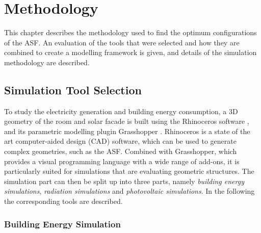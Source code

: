\chapter{Methodology}
\label{c:methodology}
	


	This chapter describes the methodology used to find the optimum configurations of the ASF. An evaluation of the tools that were selected and how they are combined to create a modelling framework is given, and details of the simulation methodology are described.

	\section{Simulation Tool Selection}


		To study the electricity generation and building energy consumption, a 3D geometry of the room and solar facade is built using the Rhinoceros software \cite{Rhino}, and its parametric modelling plugin Grasshopper \cite{grasshopper}. Rhinoceros is a state of the art computer-aided design (CAD) software, which can be used to generate complex geometries, such as the ASF. Combined with Grasshopper, which provides a visual programming language with a wide range of add-ons, it is particularly suited for simulations that are evaluating geometric structures. The simulation part can then be split up into three parts, namely \emph{building energy simulations}, \emph{radiation simulations} and \emph{photovoltaic simulations}. In the following the corresponding tools are described. 


		
		\subsection{Building Energy Simulation}

